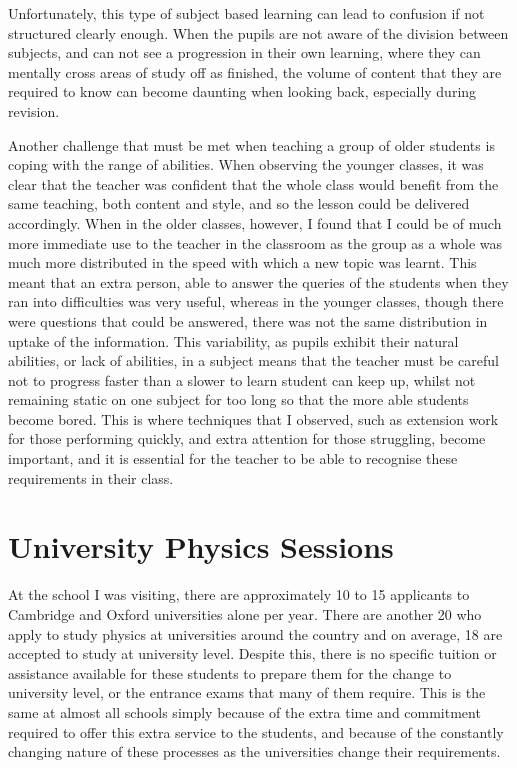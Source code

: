 		Unfortunately, this type of subject based learning can lead to confusion if not structured clearly enough. When the pupils are not aware of the division between subjects, and can not see a progression in their own learning, where they can mentally cross areas of study off as finished, the volume of content that they are required to know can become daunting when looking back, especially during revision.

		Another challenge that must be met when teaching a group of older students is coping with the range of abilities. When observing the younger classes, it was clear that the teacher was confident that the whole class would benefit from the same teaching, both content and style, and so the lesson could be delivered accordingly. When in the older classes, however, I found that I could be of much more immediate use to the teacher in the classroom as the group as a whole was much more distributed in the speed with which a new topic was learnt. This meant that an extra person, able to answer the queries of the students when they ran into difficulties was very useful, whereas in the younger classes, though there were questions that could be answered, there was not the same distribution in uptake of the information. This variability, as pupils exhibit their natural abilities, or lack of abilities, in a subject means that the teacher must be careful not to progress faster than a slower to learn student can keep up, whilst not remaining static on one subject for too long so that the more able students become bored. This is where techniques that I observed, such as extension work for those performing quickly, and extra attention for those struggling, become important, and it is essential for the teacher to be able to recognise these requirements in their class.

\section{University Physics Sessions} %
\label{sec:university_physics_sessions}
    At the school I was visiting, there are approximately 10 to 15 applicants to Cambridge and Oxford universities alone per year. There are another 20 who apply to study physics at universities around the country and on average, 18 are accepted to study at university level. Despite this, there is no specific tuition or assistance available for these students to prepare them for the change to university level, or the entrance exams that many of them require. This is the same at almost all schools simply because of the extra time and commitment required to offer this extra service to the students, and because of the constantly changing nature of these processes as the universities change their requirements.

